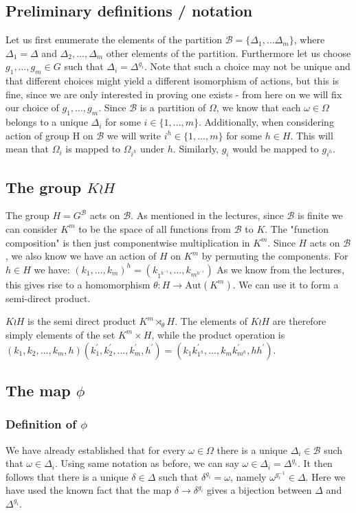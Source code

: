 \documentclass{article}
\begin{document}
\subsection*{Preliminary definitions / notation}
Let us first enumerate the elements of the partition $\mathcal{B} = \{\Delta_1, \dots \Delta_{m}\}$, where $\Delta_1 = \Delta$ and $\Delta_2, \dots, \Delta_m$ other elements of the partition. Furthermore let us choose $g_1,\dots, g_m \in G$ such that $\Delta_i = \Delta^{g_i}$. Note that such a choice may not be unique and that different choices might yield a different isomorphism of actions, but this is fine, since we are only interested in proving one exists - from here on we will fix our choice of $g_1, \dots, g_m$. Since $\mathcal{B}$ is a partition of $\Omega$, we know that each $\omega \in \Omega$ belongs to a unique $\Delta_i$ for some $i \in \{1,\dots,m\}$. Additionally, when considering action of group H on $\mathcal{B}$ we will write $i^h \in \{1,\dots,m\}$ for some $h \in H$. This will mean that $\Omega_i$ is mapped to $\Omega_{i^h}$ under $h$. Similarly, $g_i$ would be mapped to $g_{i^h}$.
\subsection*{The group $K \wr H$}
The group $H=G^\mathcal{B}$ acts on $\mathcal{B}$. As mentioned in the lectures, since $\mathcal{B}$ is finite we can consider $K^m$ to be the space of all functions from $\mathcal{B}$ to $K$. The "function composition" is then just componentwise multiplication in $K^m$. Since $H$ acts on $\mathcal{B}$, we also know we have an action of $H$ on $K^m$ by permuting the components. For $h \in H$ we have:
$(k_1, \dots, k_m)^h = (k_{1^{h^{-1}}},\dots,k_{m^{h^{-1}}})$
As we know from the lectures, this gives rise to a homomorphism $\theta: H \to \mathrm{Aut}(K^m)$. We can use it to form a semi-direct product.

$K \wr H$ is the semi direct product $K^m \rtimes_\theta H$. 
The elements of $K \wr H$ are therefore simply elements of the set $K^m \times H$, while the product operation is
$(k_1, k_2,\dots , k_m, h) (k_1^\prime, k_2^\prime, \dots, k_m^\prime, h^\prime) = (k_1 k_{1^{h}}^\prime, \dots, k_m k_{m^{h}}^\prime, h h^\prime)$.
\subsection*{The map $\phi$}
\subsubsection*{Definition of $\phi$}
We have already established that for every $\omega \in \Omega$ there is a unique $\Delta_i \in \mathcal{B}$ such that $\omega \in \Delta_i$.
Using same notation as before, we can say $\omega \in \Delta_i = \Delta^{g_i}$. It then follows that there is a unique $\delta \in \Delta$ such that $\delta^{g_i} = \omega$, namely $\omega^{g_i^{-1}} \in \Delta$. Here we have used the known fact that the map $\delta \to \delta^{g_i}$ gives a bijection between $\Delta$ and $\Delta^{g_i}$.
\end{document}
